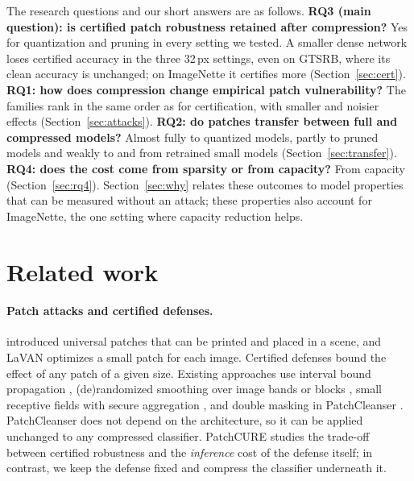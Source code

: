 \documentclass[10pt]{article}
\begin{document}
The research questions and our short answers are as follows.
\textbf{RQ3 (main question): is certified patch robustness retained after compression?} Yes for quantization and pruning in
every setting we tested. A smaller dense network loses certified accuracy in the three 32\,px settings, even on GTSRB,
where its clean accuracy is unchanged; on ImageNette it certifies more (Section~\ref{sec:cert}).
\textbf{RQ1: how does compression change empirical patch vulnerability?} The families rank in the same order as for
certification, with smaller and noisier effects (Section~\ref{sec:attacks}).
\textbf{RQ2: do patches transfer between full and compressed models?} Almost fully to quantized models, partly to pruned
models and weakly to and from retrained small models (Section~\ref{sec:transfer}).
\textbf{RQ4: does the cost come from sparsity or from capacity?} From capacity (Section~\ref{sec:rq4}).
Section~\ref{sec:why} relates these outcomes to model properties that can be measured without an attack; these properties
also account for ImageNette, the one setting where capacity reduction helps.

\section{Related work}
\label{sec:related}

\paragraph{Patch attacks and certified defenses.} \citet{brown2017adversarial} introduced universal patches that can be
printed and placed in a scene, and LaVAN \citep{karmon2018lavan} optimizes a small patch for each image. Certified defenses
bound the effect of any patch of a given size. Existing approaches use interval bound propagation
\citep{chiang2020certified}, (de)randomized smoothing over image bands or blocks
\citep{levine2020randomized,salman2022certified}, small receptive fields with secure aggregation
\citep{xiang2021patchguard}, and double masking in PatchCleanser \citep{xiang2022patchcleanser}. PatchCleanser does not
depend on the architecture, so it can be applied unchanged to any compressed classifier. PatchCURE
\citep{xiang2024patchcure} studies the trade-off between certified robustness and the \emph{inference} cost of the defense
itself; in contrast, we keep the defense fixed and compress the classifier underneath it.
\end{document}
